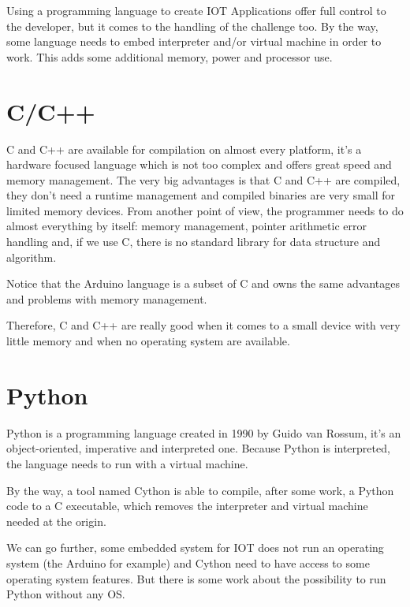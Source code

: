 \label{cha:proglang-for-iot}

Using a programming language to create IOT Applications offer full control to
the developer, but it comes to the handling of the challenge too. By the way, some
language needs to embed interpreter and/or virtual machine in order to work. This
adds some additional memory, power and processor use.

\section{C/C++}
\label{subsec:cc++}

C and C++ are available for compilation on almost every platform, it’s a
hardware focused language which is not too complex and offers great speed and
memory management. The very big advantages is that C and C++ are compiled, they
don’t need a runtime management and compiled binaries are very small for limited
memory devices. From another point of view, the programmer needs to do almost
everything by itself: memory management, pointer arithmetic error handling
and, if we use C, there is no standard library for data structure and algorithm.

Notice that the Arduino language is a subset of C and owns the same advantages
and problems with memory management.

Therefore, C and C++ are really good when it comes to a small device with very
little memory and when no operating system are available.

\section{Python}
\label{subsec:python}

Python is a programming language created in 1990 by Guido van Rossum, it’s an
object-oriented, imperative and interpreted one. Because Python is interpreted,
the language needs to run with a virtual machine.

By the way, a tool named Cython\cite{behnel2010cython} is able to compile, after
some work, a Python code to a C executable, which removes the interpreter and
virtual machine needed at the origin.

We can go further, some embedded system for IOT does not run an operating system
(the Arduino for example) and Cython need to have access to some operating
system features. But there is some work about the possibility to run Python
without any OS\cite{jakeedge2015}.

